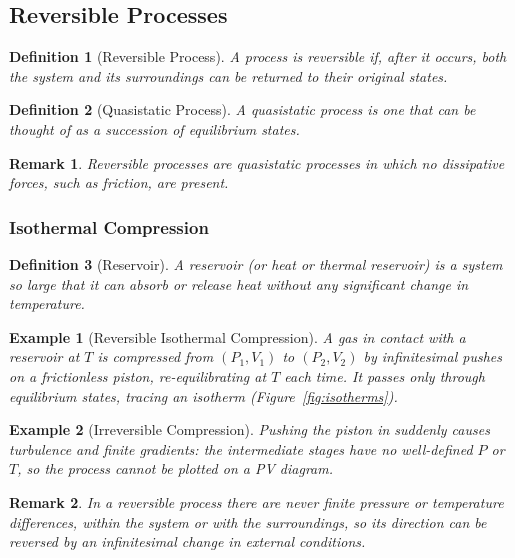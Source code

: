 \documentclass{article}
\newtheorem{definition}{Definition}
\newtheorem{example}{Example}
\newtheorem{remark}{Remark}
\begin{document}
\subsection{Reversible Processes}
\begin{definition}[Reversible Process]
    A process is reversible if, after it occurs, both the system and its surroundings can be returned to their original states.
\end{definition}
\begin{definition}[Quasistatic Process]
    A quasistatic process is one that can be thought of as a succession of equilibrium states.
\end{definition}
\begin{remark}
    Reversible processes are quasistatic processes in which no dissipative forces, such as friction, are present.
\end{remark}

\subsubsection{Isothermal Compression}
\begin{definition}[Reservoir]
    A reservoir (or heat or thermal reservoir) is a system so large that it can absorb or release heat without any significant change in temperature.
\end{definition}
\begin{example}[Reversible Isothermal Compression]
    A gas in contact with a reservoir at $T$ is compressed from $(P_1, V_1)$ to $(P_2, V_2)$ by infinitesimal pushes on a frictionless piston, re-equilibrating at $T$ each time. It passes only through equilibrium states, tracing an isotherm (Figure~\ref{fig:isotherms}).
\end{example}
\begin{example}[Irreversible Compression]
    Pushing the piston in suddenly causes turbulence and finite gradients: the intermediate stages have no well-defined $P$ or $T$, so the process cannot be plotted on a PV diagram.
\end{example}
\begin{remark}
    In a reversible process there are never finite pressure or temperature differences, within the system or with the surroundings, so its direction can be reversed by an infinitesimal change in external conditions.
\end{remark}
\end{document}
